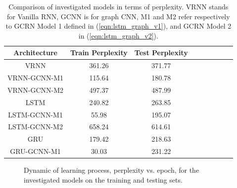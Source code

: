\documentclass{article} %
\newcommand{\eqnref}[1]{(\ref{eqn:#1})}
\begin{document}
\begin{table}[h!]
 \centering
{\small
\begin{tabular}{|c|c|c|c|c|c|c|c|c|}
\hline
 Architecture & Train Perplexity & Test Perplexity  \\
\hline
\hline
VRNN & 361.26 & 371.77 \\
VRNN-GCNN-M1 & 115.64 & 180.78 \\
VRNN-GCNN-M2 & 497.37 & 487.99 \\
\hline
\hline
LSTM & 240.82 & 263.85 \\
LSTM-GCNN-M1 & 55.98 & 195.07 \\
LSTM-GCNN-M2 & 658.24 & 614.61 \\
\hline
\hline
GRU & 179.42 & 218.63 \\
GRU-GCNN-M1 & 30.03 & 231.22 \\
\hline
\end{tabular}
}
\caption{Comparison of investigated models in terms of perplexity. VRNN stands for Vanilla RNN, GCNN is for graph CNN, M1 and M2 refer respectively to GCRN Model 1 defined in \eqnref{lstm_graph_v1}, and GCRN Model 2 in \eqnref{lstm_graph_v2}.} 
\label{tab1}
\end{table}



\begin{figure}[h!]
\centering
{}
\caption{Dynamic of learning process, perplexity vs. epoch, for the investigated models on the training and testing sets.}
\label{fig3}
\end{figure}
\end{document}
